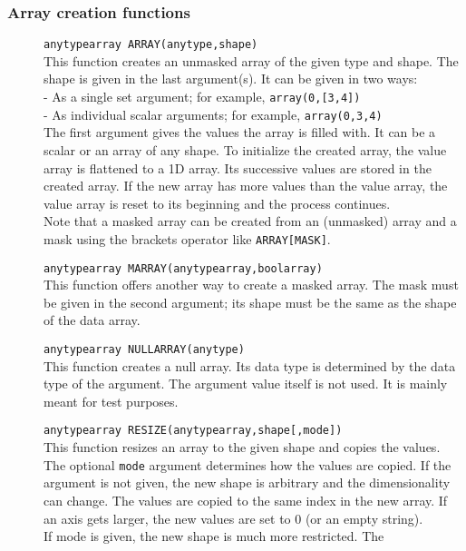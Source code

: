 \subsubsection{Array creation functions}
\begin{description}
  \item[] \texttt{anytypearray ARRAY(anytype,shape)}\\
    This function creates an unmasked array of the given type and shape.
    The shape is given in the last argument(s).
    It can be given in two ways:
    \\- As a single set argument; for example, \texttt{array(0,[3,4])}
    \\- As individual scalar arguments; for example, \texttt{array(0,3,4)}
    \\The first argument gives the values the array is filled with.
    It can be a scalar or an array of any shape. To initialize the
    created array, the value array is flattened to a 1D array.
    Its successive values are stored in the created array. If the
    new array has more values than the value array, the value array is
    reset to its beginning and the process continues.
    \\Note that a masked array can be created from an (unmasked) array and a mask
    using the brackets operator like \texttt{ARRAY[MASK]}.
  \item[] \texttt{anytypearray MARRAY(anytypearray,boolarray)}\\
    This function offers another way to create a masked array. The
    mask must be given in the second argument; its shape must be the
    same as the shape of the data array.
  \item[] \texttt{anytypearray NULLARRAY(anytype)}\\
    This function creates a null array. Its data type is determined by
    the data type of the argument. The argument value itself is not
    used.
    It is mainly meant for test purposes.
  \item[] \texttt{anytypearray RESIZE(anytypearray,shape[,mode])}\\
    This function resizes an array to the given shape and copies the
    values. The optional \texttt{mode} argument determines how the values are
    copied. If the argument is not given, the new shape is arbitrary
    and the dimensionality can change. The values are copied to the same index in the
    new array. If an axis gets larger, the new values are set to 0
    (or an empty string).
    \\If mode is given, the new shape is much more restricted. The

\end{description}
